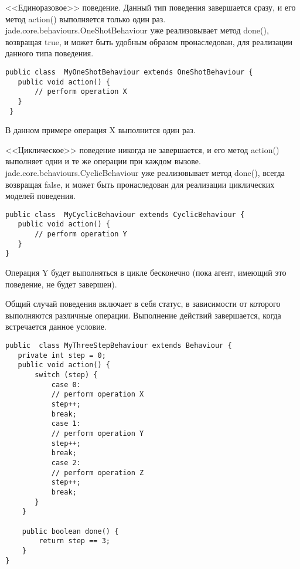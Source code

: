 <<Единоразовое>> поведение. Данный тип поведения завершается сразу, и его метод action() выполняется только один раз. jade.core.behaviours.OneShotBehaviour уже реализовывает метод done(), возвращая true, и может быть удобным образом пронаследован, для реализации данного типа поведения.
\begin{lstlisting}
public class  MyOneShotBehaviour extends OneShotBehaviour { 
   public void action() { 
       // perform operation X 
   } 
 }
\end{lstlisting}
В данном примере операция X выполнится один раз.

<<Циклическое>> поведение никогда не завершается, и его метод action() выполняет одни и те же операции при каждом вызове. jade.core.behaviours.CyclicBehaviour уже реализовывает метод done(), всегда возвращая false, и может быть пронаследован для реализации циклических моделей поведения.
\begin{lstlisting}
public class  MyCyclicBehaviour extends CyclicBehaviour { 
   public void action() { 
       // perform operation Y 
   } 
}
\end{lstlisting}

Операция Y будет выполняться в цикле бесконечно (пока агент, имеющий это поведение, не будет завершен).

Общий случай поведения включает в себя статус, в зависимости от которого выполняются различные операции. Выполнение действий завершается, когда встречается данное условие.
\begin{lstlisting}
public  class MyThreeStepBehaviour extends Behaviour { 
   private int step = 0; 
   public void action() { 
       switch (step) { 
           case 0: 
           // perform operation X 
           step++; 
           break; 
           case 1: 
           // perform operation Y 
           step++; 
           break; 
           case 2: 
           // perform operation Z 
           step++; 
           break; 
       } 
    } 

    public boolean done() { 
        return step == 3; 
    } 
}
\end{lstlisting}

